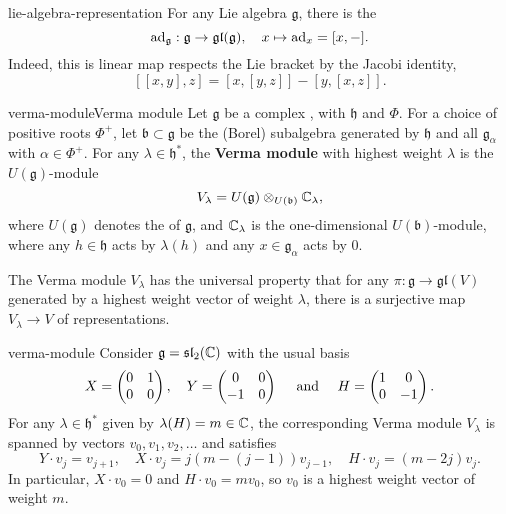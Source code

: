 \begin{example}{lie-algebra-representation}
    For any Lie algebra $\mathfrak{g}$, there is the 
    \[ \textup{ad}_\mathfrak{g} : \mathfrak{g} \to \mathfrak{gl}(\mathfrak{g}), \quad x \mapsto \textup{ad}_x = [x, -] . \]
    Indeed, this is linear map respects the Lie bracket by the Jacobi identity,
    \[ [[x, y], z] = [x, [y, z]] - [y, [x, z]] . \]
\end{example}

\begin{topic}{verma-module}{Verma module}
    Let $\mathfrak{g}$ be a complex , with  $\mathfrak{h}$ and  $\Phi$. For a choice of positive roots $\Phi^+$, let $\mathfrak{b} \subset \mathfrak{g}$ be the (Borel) subalgebra generated by $\mathfrak{h}$ and all $\mathfrak{g}_\alpha$ with $\alpha \in \Phi^+$. For any $\lambda \in \mathfrak{h}^*$, the \textbf{Verma module} with highest weight $\lambda$ is the $U(\mathfrak{g})$-module
    \[ V_\lambda = U(\mathfrak{g}) \otimes_{U(\mathfrak{b})} \mathbb{C}_\lambda , \]
    where $U(\mathfrak{g})$ denotes the  of $\mathfrak{g}$, and $\mathbb{C}_\lambda$ is the one-dimensional $U(\mathfrak{b})$-module, where any $h \in \mathfrak{h}$ acts by $\lambda(h)$ and any $x \in \mathfrak{g}_\alpha$ acts by $0$.
    
    The Verma module $V_\lambda$ has the universal property that for any  $\pi : \mathfrak{g} \to \mathfrak{gl}(V)$ generated by a highest weight vector of weight $\lambda$, there is a surjective map $V_\lambda \to V$ of representations.
\end{topic}

\begin{example}{verma-module}
    Consider $\mathfrak{g} = \mathfrak{sl}_2(\mathbb{C})$ with the usual basis
    \[ X = \begin{pmatrix} 0 & 1 \\ 0 & 0 \end{pmatrix}, \quad Y = \begin{pmatrix} 0 & 0 \\ -1 & 0 \end{pmatrix} \quad \textup{ and } \quad H = \begin{pmatrix} 1 & 0 \\ 0 & -1 \end{pmatrix} . \]
    For any $\lambda \in \mathfrak{h}^*$ given by $\lambda(H) = m \in \mathbb{C}$, the corresponding Verma module $V_\lambda$ is spanned by vectors $v_0, v_1, v_2, \ldots$ and satisfies
    \[ Y \cdot v_j = v_{j + 1}, \quad X \cdot v_j = j(m - (j - 1)) v_{j - 1}, \quad H \cdot v_j = (m - 2j) v_j . \]
    In particular, $X \cdot v_0 = 0$ and $H \cdot v_0 = m v_0$, so $v_0$ is a highest weight vector of weight $m$.
\end{example}

